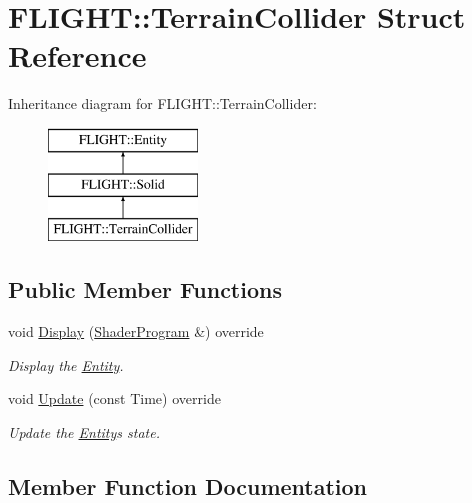 \hypertarget{struct_f_l_i_g_h_t_1_1_terrain_collider}{}\section{F\+L\+I\+G\+HT\+:\+:Terrain\+Collider Struct Reference}
\label{struct_f_l_i_g_h_t_1_1_terrain_collider}
Inheritance diagram for F\+L\+I\+G\+HT\+:\+:Terrain\+Collider\+:\begin{figure}[H]
\begin{center}
\leavevmode
\includegraphics[height=3.000000cm]{struct_f_l_i_g_h_t_1_1_terrain_collider}
\end{center}
\end{figure}
\subsection*{Public Member Functions}
\begin{DoxyCompactItemize}
\item 
void \hyperlink{struct_f_l_i_g_h_t_1_1_terrain_collider_ad3930b5490b7083f5b9c97ae78082f3f}{Display} (\hyperlink{class_f_l_i_g_h_t_1_1_shader_program}{Shader\+Program} \&) override
\begin{DoxyCompactList}\small\item\em Display the \hyperlink{class_f_l_i_g_h_t_1_1_entity}{Entity}. \end{DoxyCompactList}\item 
void \hyperlink{struct_f_l_i_g_h_t_1_1_terrain_collider_a02758bce759ab3878e96a9e5d80e37f9}{Update} (const Time) override
\begin{DoxyCompactList}\small\item\em Update the \hyperlink{class_f_l_i_g_h_t_1_1_entity}{Entity}\textquotesingle{}s state. \end{DoxyCompactList}\end{DoxyCompactItemize}


\subsection{Member Function Documentation}
\mbox{\label{struct_f_l_i_g_h_t_1_1_terrain_collider_ad3930b5490b7083f5b9c97ae78082f3f}} 
